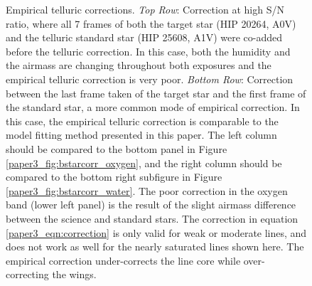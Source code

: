 \begin{figure}
\begin{center}
\caption{Empirical telluric corrections. \emph{Top Row}: Correction at high S/N ratio, where all 7 frames of both the target star (HIP 20264, A0V) and the telluric standard star (HIP 25608, A1V) were co-added before the telluric correction. In this case, both the humidity and the airmass are changing throughout both exposures and the empirical telluric correction is very poor. \emph{Bottom Row}: Correction between the last frame taken of the target star and the first frame of the standard star, a more common mode of empirical correction. In this case, the empirical telluric correction is comparable to the model fitting method presented in this paper. The left column should be compared to the bottom panel in Figure \ref{paper3_fig:bstarcorr_oxygen}, and the right column should be compared to the bottom right subfigure in Figure \ref{paper3_fig:bstarcorr_water}. The poor correction in the oxygen band (lower left panel) is the result of the slight airmass difference between the science and standard stars. The correction in equation \ref{paper3_eqn:correction} is only valid for weak or moderate lines, and does not work as well for the nearly saturated lines shown here. The empirical correction under-corrects the line core while over-correcting the wings.}

\label{paper3_fig:bstarcorr_empirical}
\end{center}
\end{figure}




